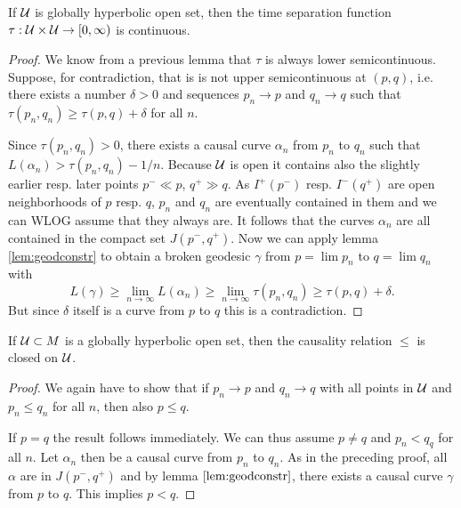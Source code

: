 \begin{lemma}\label{lem:tsfcont}
If $\mathcal{U}$ is globally hyperbolic open set, then the time separation function $\tau:\mathcal{U}\times\mathcal{U}\to [0,\infty)$ is continuous.
\end{lemma}
\begin{proof}
We know from a previous lemma that $\tau$ is always lower semicontinuous. Suppose, for contradiction, that is is not upper semicontinuous at $(p,q)$, i.e. there exists a number $\delta>0$ and sequences $p_n\to p$ and $q_n\to q$ such that $\tau(p_n,q_n) \ge \tau(p,q) + \delta$ for all $n$.

Since $\tau(p_n,q_n)>0$, there exists a causal curve $\alpha_n$ from $p_n$ to $q_n$ such that $L(\alpha_n)>\tau(p_n,q_n) - 1/n$. Because $\mathcal{U}$ is open it contains also the slightly earlier resp. later points $p^-\ll p$, $q^+\gg q$. As $I^+(p^-)$ resp. $I^-(q^+)$ are open neighborhoods of $p$ resp. $q$, $p_n$ and $q_n$ are eventually contained in them and we can WLOG assume that they always are. It follows that the curves $\alpha_n$ are all contained in the compact set $J(p^-,q^+)$. Now we can apply lemma \ref{lem:geodconstr} to obtain a broken geodesic $\gamma$ from $p=\lim p_n$ to $q=\lim q_n$ with 
\[
L(\gamma) \ge \lim_{n\to\infty} L(\alpha_n) \ge \lim_{n\to\infty}\tau(p_n,q_n) \ge \tau(p,q) + \delta.
\]
But since $\delta$ itself is a curve from $p$ to $q$ this is a contradiction.
\end{proof}

\begin{lemma}\label{lem:Jclosed}
If $\mathcal{U}\subset M$ is a globally hyperbolic open set, then the causality relation $\leq$ is closed on $\mathcal{U}$.
\end{lemma}
\begin{proof}
We again have to show that if $p_n\to p$ and $q_n\to q$ with all points in $\mathcal{U}$ and $p_n \leq q_n$ for all $n$, then also $p\leq q$.

If $p=q$ the result follows immediately. We can thus assume $p\neq q$ and $p_n<q_q$ for all $n$. Let $\alpha_n$ then be a causal curve from $p_n$ to $q_n$. As in the preceding proof, all $\alpha$ are in $J(p^-,q^+)$ and by lemma $\ref{lem:geodconstr}$, there exists a causal curve $\gamma$ from $p$ to $q$. This implies $p<q$.
\end{proof}

